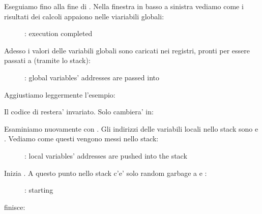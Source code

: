 Eseguiamo fino alla fine di \ttfone.
Nella finestra in basso a sinistra vediamo come i risultati dei calcoli appaiono nelle viariabili globali:

\begin{figure}[H]
\centering
{}
\caption{\olly: \ttfone execution completed}
\label{fig:pointers_olly_global_3}
\end{figure}

\clearpage

Adesso i valori delle variabili globali sono caricati nei registri, pronti per essere passati a \printf (tramite lo stack):

\begin{figure}[H]
\centering
{}
\caption{\olly: 
global variables' addresses are passed into \printf}
\label{fig:pointers_olly_global_4}
\end{figure}


Aggiustiamo leggermente l'esempio:



Il codice di \ttfone restera' invariato.
Solo \main cambiera' in:



\clearpage
Esaminiamo nuovamente con \olly.
Gli indirizzi delle variabili locali nello stack sono  e .
Vediamo come questi vengono messi nello stack: 

\begin{figure}[H]
\centering
{}
\caption{\olly: local variables' addresses are
pushed into the stack}
\label{fig:pointers_olly_stk_1}
\end{figure}

\clearpage
Inizia \ttfone.
A questo punto nello stack c'e' solo random garbage a  e  :

\begin{figure}[H]
\centering
{}
\caption{\olly: \ttfone starting}
\label{fig:pointers_olly_stk_2}
\end{figure}

\clearpage
\ttfone finisce:

